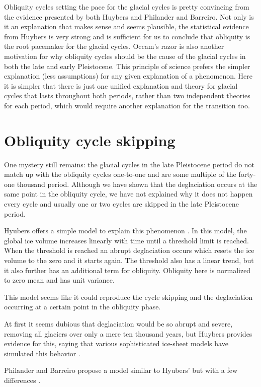 \documentclass[11pt]{article}
\begin{document}
Obliquity cycles setting the pace for the glacial cycles is pretty convincing from the evidence presented by both Huybers and Philander and Barreiro.
Not only is it an explanation that makes sense and seems plausible, the statistical evidence from Huybers is very strong and is sufficient for us to conclude that obliquity is the root pacemaker for the glacial cycles.
Occam's razor is also another motivation for why obliquity cycles should be the cause of the glacial cycles in both the late and early Pleistocene.
This principle of science prefers the simpler explanation (less assumptions) for any given explanation of a phenomenon.
Here it is simpler that there is just one unified explanation and theory for glacial cycles that lasts throughout both periods, rather than two independent theories for each period, which would require another explanation for the transition too.

\section{Obliquity cycle skipping}
One mystery still remains: the glacial cycles in the late Pleistocene period do not match up with the obliquity cycles one-to-one and are some multiple of the forty-one thousand period.
Although we have shown that the deglaciation occurs at the same point in the obliquity cycle, we have not explained why it does not happen every cycle and usually one or two cycles are skipped in the late Pleistocene period.

Hyubers offers a simple model to explain this phenomenon \cite{huybers}.
In this model, the global ice volume increases linearly with time until a threshold limit is reached.
When the threshold is reached an abrupt deglaciation occurs which resets the ice volume to the zero and it starts again.
The threshold also has a linear trend, but it also further has an additional term for obliquity.
Obliquity here is normalized to zero mean and has unit variance.

This model seems like it could reproduce the cycle skipping and the deglaciation occurring at a certain point in the obliquity phase. 

At first it seems dubious that deglaciation would be so abrupt and severe, removing all glaciers over only a mere ten thousand years, but Huybers provides evidence for this, saying that various sophisticated ice-sheet models have simulated this behavior \cite{huybers}.

Philander and Barreiro propose a model similar to Hyubers' but with a few differences \cite{philander}.
\end{document}
